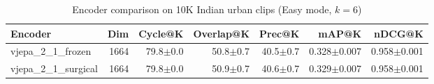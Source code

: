 \begin{table}[ht]
\centering
\caption{Encoder comparison on 10K Indian urban clips (Easy mode, $k=6$)}
\label{tab:encoder_comparison}
\begin{tabular}{lrrrrrr}
\toprule
Encoder & Dim & Cycle@K & Overlap@K & Prec@K & mAP@K & nDCG@K \\
\midrule
vjepa\_2\_1\_frozen & 1664 & 79.8{\tiny$\pm$0.0} & 50.8{\tiny$\pm$0.7} & 40.5{\tiny$\pm$0.7} & 0.328{\tiny$\pm$0.007} & 0.958{\tiny$\pm$0.001} \\
vjepa\_2\_1\_surgical & 1664 & 79.8{\tiny$\pm$0.0} & 50.9{\tiny$\pm$0.7} & 40.6{\tiny$\pm$0.7} & 0.329{\tiny$\pm$0.007} & 0.958{\tiny$\pm$0.001} \\
\bottomrule
\end{tabular}
\end{table}
